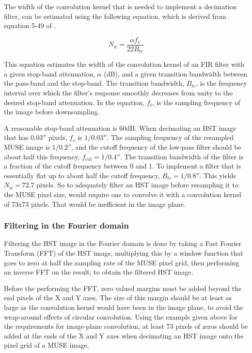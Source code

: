 \documentclass[12pt,twoside,a4paper]{article}
\newcommand{\arcsec}{''}
\begin{document}
The width of the convolution kernel that is needed to implement a
decimation filter, can be estimated using the following equation,
which is derived from equation 5-49 of \cite{lyons2011}.

\begin{equation}
  N_w = \frac{\alpha f_s} {22 B_{tr}}
\end{equation}

This equation estimates the width of the convolution kernel of an FIR
filter with a given stop-band attenuation, $\alpha$ (dB), and a given
transition bandwidth between the pass-band and the stop-band. The
transition bandwidth, $B_{tr}$, is the frequency interval over which
the filter's response smoothly decreases from unity to the desired
stop-band attenuation. In the equation, $f_s$, is the sampling
frequency of the image before downsampling.

A reasonable stop-band attenuation is 60dB. When decimating an HST
image that has $0.03\arcsec$ pixels, $f_s$ is $1/0.03\arcsec$. The
sampling frequency of the resampled MUSE image is $1/0.2\arcsec$, and
the cutoff frequency of the low-pass filter should be about half this
frequency, $f_{cut}=1/0.4\arcsec$. The transition bandwidth of the
filter is a fraction of the cutoff frequency between 0 and 1. To
implement a filter that is essentially flat up to about half the
cutoff frequency, $B_{tr} =1/0.8\arcsec$. This yields $N_w = 72.7$
pixels. So to adequately filter an HST image before resampling it to
the MUSE pixel size, would require one to convolve it with a
convolution kernel of 73x73 pixels. That would be inefficient in the
image plane.

\subsubsection{Filtering in the Fourier domain}

Filtering the HST image in the Fourier domain is done by taking a Fast
Fourier Transform (FFT) of the HST image, multiplying this by a window
function that goes to zero at half the sampling rate of the MUSE pixel
grid, then performing an inverse FFT on the result, to obtain the
filtered HST image.

Before the performing the FFT, zero valued margins must be added
beyond the end pixels of the X and Y axes. The size of this margin
should be at least as large as the convolution kernel would have been
in the image plane, to avoid the wrap-around effects of circular
convolution.  Using the example given above for the requirements for
image-plane convolution, at least 73 pixels of zeros should be added
at the ends of the X and Y axes when decimating an HST image onto the
pixel grid of a MUSE image.
\end{document}
